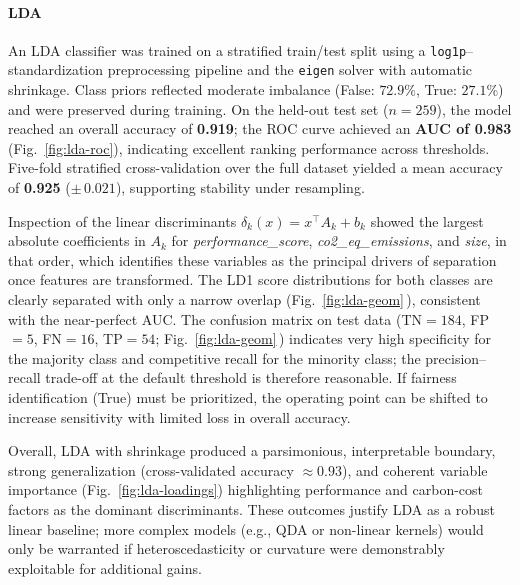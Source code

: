\documentclass[journal]{IEEEtran}
\begin{document}
\paragraph{LDA}
An LDA classifier was trained on a stratified train/test split using a \texttt{log1p}--standardization preprocessing pipeline and the \texttt{eigen} solver with automatic shrinkage. Class priors reflected moderate imbalance (False: $72.9\%$, True: $27.1\%$) and were preserved during training. On the held-out test set ($n=259$), the model reached an overall accuracy of \textbf{0.919}; the ROC curve achieved an \textbf{AUC of 0.983} (Fig.~\ref{fig:lda-roc}), indicating excellent ranking performance across thresholds. Five-fold stratified cross-validation over the full dataset yielded a mean accuracy of \textbf{0.925} ($\pm\,0.021$), supporting stability under resampling.

Inspection of the linear discriminants $\delta_k(x)=x^\top A_k+b_k$ showed the largest absolute coefficients in $A_k$ for \emph{performance\_score}, \emph{co2\_eq\_emissions}, and \emph{size}, in that order, which identifies these variables as the principal drivers of separation once features are transformed. The LD1 score distributions for both classes are clearly separated with only a narrow overlap (Fig.~\ref{fig:lda-geom}\,), consistent with the near-perfect AUC. The confusion matrix on test data (TN$=184$, FP$=5$, FN$=16$, TP$=54$; Fig.~\ref{fig:lda-geom}\,) indicates very high specificity for the majority class and competitive recall for the minority class; the precision--recall trade-off at the default threshold is therefore reasonable. If fairness identification (True) must be prioritized, the operating point can be shifted to increase sensitivity with limited loss in overall accuracy.

Overall, LDA with shrinkage produced a parsimonious, interpretable boundary, strong generalization (cross-validated accuracy $\approx0.93$), and coherent variable importance (Fig.~\ref{fig:lda-loadings}) highlighting performance and carbon-cost factors as the dominant discriminants. These outcomes justify LDA as a robust linear baseline; more complex models (e.g., QDA or non-linear kernels) would only be warranted if heteroscedasticity or curvature were demonstrably exploitable for additional gains.
\end{document}
